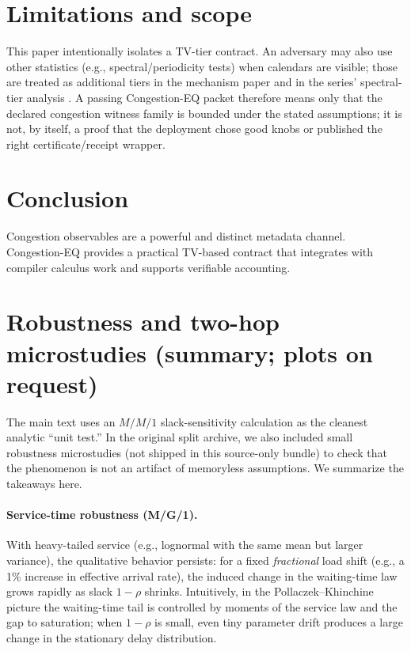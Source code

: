 \documentclass[11pt]{article}
\theoremstyle{definition}
\theoremstyle{remark}
\begin{document}
\section{Limitations and scope}
This paper intentionally isolates a TV-tier contract.
An adversary may also use other statistics (e.g., spectral/periodicity tests) when calendars are visible; those are treated as additional tiers in the mechanism paper and in the series' spectral-tier analysis \cite{series:spectral}.
A passing Congestion-EQ packet therefore means only that the declared congestion witness family is bounded under the stated assumptions; it is not, by itself, a proof that the deployment chose good knobs or published the right certificate/receipt wrapper.\cite{series:pscq,series:wcongeq}

\section{Conclusion}
Congestion observables are a powerful and distinct metadata channel.
Congestion-EQ provides a practical TV-based contract that integrates with compiler calculus work and supports verifiable accounting.


\section{Robustness and two-hop microstudies (summary; plots on request)}\label{sec:congeq_robust}
The main text uses an $M/M/1$ slack-sensitivity calculation as the cleanest analytic ``unit test.''
In the original split archive, we also included small robustness microstudies (not shipped in this source-only bundle) to check that the phenomenon is not an artifact of memoryless assumptions.
We summarize the takeaways here.

\paragraph{Service-time robustness (M/G/1).}
With heavy-tailed service (e.g., lognormal with the same mean but larger variance), the qualitative behavior persists:
for a fixed \emph{fractional} load shift (e.g., a 1\% increase in effective arrival rate), the induced change in the waiting-time law grows rapidly as slack $1-\rho$ shrinks.
Intuitively, in the Pollaczek--Khinchine picture the waiting-time tail is controlled by moments of the service law and the gap to saturation; when $1-\rho$ is small, even tiny parameter drift produces a large change in the stationary delay distribution.
\end{document}
